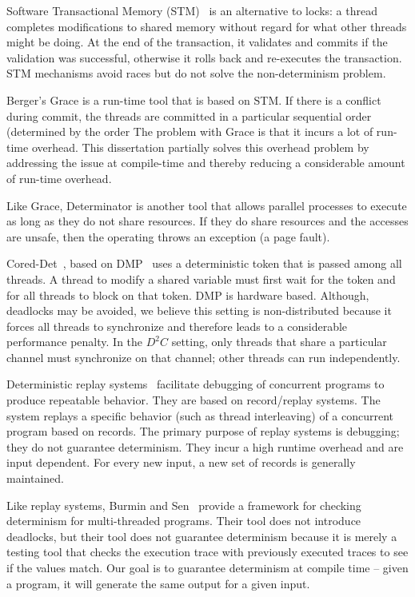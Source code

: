 Software Transactional Memory (STM)~\cite{shavit1995software}
  is an alternative to locks: a thread completes modifications to 
shared memory without regard for what other threads might be doing. At the end of the transaction,
it validates and commits if the validation was successful, otherwise it rolls back and re-executes
the transaction. STM mechanisms avoid races but do not solve the non-determinism problem.

Berger's Grace\cite{berger2009grace} is a run-time tool
that is based on STM. 
If there is a conflict during commit, the threads are committed in
a particular sequential order (determined by the order
The problem with Grace is that it incurs a lot of run-time
overhead. This dissertation  partially solves this overhead problem
by addressing the issue at compile-time and
thereby reducing a considerable amount of run-time overhead.

Like Grace, Determinator\cite{aviram2010efficient} is another tool
that allows parallel processes to execute as long as they do not share 
resources. If they do share resources and the accesses are unsafe, then
the operating throws an exception (a page fault). 

Cored-Det~\cite{bergan2010coreDet}, based on DMP~\cite{devietti2009dmp} 
uses a deterministic token that is passed
among all threads.  A thread to modify a shared variable must first
wait for the token and for all threads to block on that
token. DMP is hardware based. 
Although, deadlocks may be avoided, we believe this setting is
non-distributed because it forces all threads to synchronize and
therefore leads to a considerable performance penalty. In the $D^2C$ 
setting, only threads that share a particular channel must synchronize
on that channel; other threads can run independently.

 Deterministic replay systems~\cite{choi1998deterministic,altekar2009odr} facilitate debugging of concurrent programs to produce
repeatable behavior. They are based on record/replay systems. The system
replays a specific behavior (such as thread interleaving) of a concurrent
program based on records. The primary purpose of replay systems 
is debugging; they do not guarantee determinism. 
They incur a high runtime overhead and are input dependent.
For every new input, a new set of records is generally maintained.

Like replay systems, Burmin and Sen~\cite{Burnim2009asserting} provide a framework for
checking determinism for multi-threaded programs. Their tool does not
introduce deadlocks, but their tool does not guarantee determinism
because it is merely a testing tool that checks the execution trace
with previously executed traces to see if the values match. Our
goal is to guarantee determinism at compile time -- given a program,
it will generate the same output for a given input.




